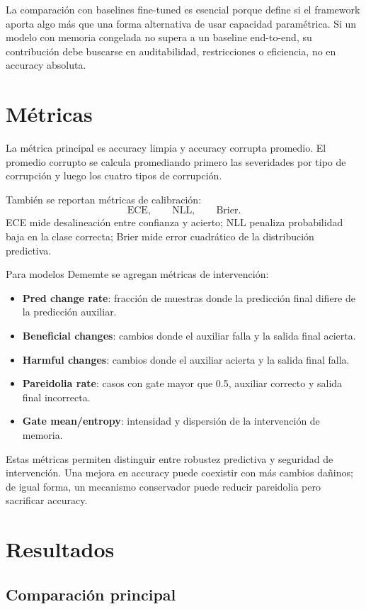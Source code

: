 \documentclass[11pt,a4paper]{article}
\begin{document}
La comparación con baselines fine-tuned es esencial porque define si el framework
aporta algo más que una forma alternativa de usar capacidad paramétrica. Si un
modelo con memoria congelada no supera a un baseline end-to-end, su contribución
debe buscarse en auditabilidad, restricciones o eficiencia, no en accuracy
absoluta.

\section{Métricas}

La métrica principal es accuracy limpia y accuracy corrupta promedio. El promedio
corrupto se calcula promediando primero las severidades por tipo de corrupción y
luego los cuatro tipos de corrupción.

También se reportan métricas de calibración:
\[
\text{ECE},\qquad \text{NLL},\qquad \text{Brier}.
\]
ECE mide desalineación entre confianza y acierto; NLL penaliza probabilidad baja
en la clase correcta; Brier mide error cuadrático de la distribución predictiva.

Para modelos Dememte se agregan métricas de intervención:
\begin{itemize}
    \item \textbf{Pred change rate}: fracción de muestras donde la predicción
    final difiere de la predicción auxiliar.
    \item \textbf{Beneficial changes}: cambios donde el auxiliar falla y la
    salida final acierta.
    \item \textbf{Harmful changes}: cambios donde el auxiliar acierta y la
    salida final falla.
    \item \textbf{Pareidolia rate}: casos con gate mayor que 0.5, auxiliar
    correcto y salida final incorrecta.
    \item \textbf{Gate mean/entropy}: intensidad y dispersión de la intervención
    de memoria.
\end{itemize}

Estas métricas permiten distinguir entre robustez predictiva y seguridad de
intervención. Una mejora en accuracy puede coexistir con más cambios dañinos; de
igual forma, un mecanismo conservador puede reducir pareidolia pero sacrificar
accuracy.

\section{Resultados}

\subsection{Comparación principal}
\end{document}
